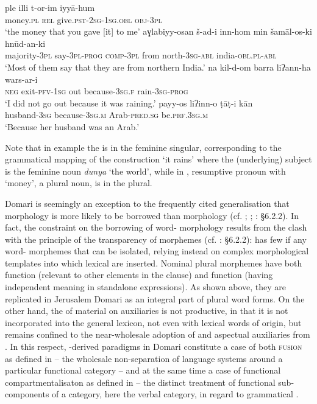 \documentclass[output=paper]{langsci/langscibook}
\begin{document}
\ea \gll   ple illi t-or-im iyyā-hum\\
       money.\textsc{pl} \textsc{rel} give.\textsc{pst-2sg-1sg.obl} \textsc{obj-3pl}\\
\glt   ‘the money that you gave [it] to me’ \label{ple}
\ex\label{most}
\gll aɣlabiyy-osan š-ad-i inn-hom min šamāl-os-ki hnūd-an-ki\\
     majority-\textsc{3pl} say-\textsc{3pl-prog} \textsc{comp-3pl} from        north-\textsc{3sg-abl} india-\textsc{obl.pl-abl}\\
\glt   ‘Most of them say that they are from northern India.’
\ex \gll na kil-d-om barra liʔann-ha wars-ar-i\\
       \textsc{neg} exit-\textsc{pfv-1sg} out because-\textsc{3sg.f} rain-\textsc{3sg-prog}\\
\glt   ‘I did not go out because it was raining.’\label{barra}
\ex \gll     payy-os liʔinn-o ṭāṭ-i kān\\
       husband-\textsc{3sg} because-\textsc{3sg.m} Arab-\textsc{pred.sg} be.\textsc{prf.3sg.m}\\
\glt   ‘Because her husband was an Arab.’
\z

Note that in example  the  is in the feminine singular, corresponding to the grammatical mapping of the   construction ‘it rains’ where the (underlying) subject is the feminine noun \textit{dunya} ‘the world’, while in , resumptive pronoun  with ‘money’, a plural noun, is in the plural.

Domari is seemingly an exception to the frequently cited generalisation that  morphology is more likely to be borrowed than  morphology (cf. \citealt{Moravcsik1978}; \citealt{Field2002}; \citealt{Matras2009}: §6.2.2). In fact, the constraint on the borrowing of word- morphology results from the clash with the principle of the transparency of morphemes (cf. \citealt{Matras2009}: §6.2.2):  has few if any word- morphemes that can be isolated, relying instead on complex morphological templates into which lexical  are inserted. Nominal plural morphemes have both  function (relevant to other elements in the clause) and  function (having independent meaning in standalone expressions). As shown above, they are replicated in Jerusalem Domari as an integral part of  plural word forms. On the other hand, the  of  material on auxiliaries is not productive, in that it is not incorporated into the general lexicon, not even with lexical words of  origin, but remains confined to the near-wholesale adoption of  and aspectual auxiliaries from . In this respect, -derived  paradigms in Domari constitute a case of both \textsc{fusion} as defined in \citet{Matras2009} – the wholesale non-separation of language systems around a particular functional category – and at the same time a case of functional compartmentalisaton as defined in \citet{Matras2015} – the distinct treatment of functional sub-components of a category, here the verbal category, in regard to grammatical . 
\end{document}

